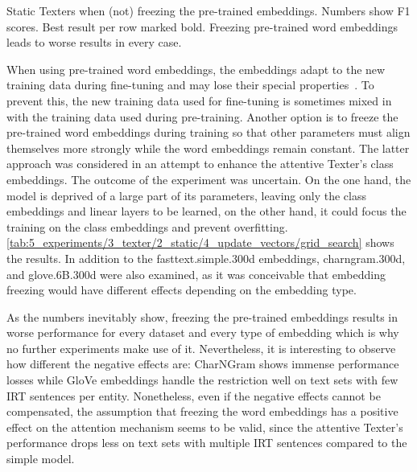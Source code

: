\begin{table}
    \centering
    
    \caption{Static Texters when (not) freezing the pre-trained embeddings. Numbers show F1 scores. Best result per row marked bold. Freezing pre-trained word embeddings leads to worse results in every case.}
    \label{tab:5_experiments/3_texter/2_static/4_update_vectors/grid_search}
\end{table}

When using pre-trained word embeddings, the embeddings adapt to the new training data during fine-tuning and may lose their special properties~\cite{He2019AnalyzingTF}. To prevent this, the new training data used for fine-tuning is sometimes mixed in with the training data used during pre-training. Another option is to freeze the pre-trained word embeddings during training so that other parameters must align themselves more strongly while the word embeddings remain constant. The latter approach was considered in an attempt to enhance the attentive Texter's class embeddings. The outcome of the experiment was uncertain. On the one hand, the model is deprived of a large part of its parameters, leaving only the class embeddings and linear layers to be learned, on the other hand, it could focus the training on the class embeddings and prevent overfitting. \autoref{tab:5_experiments/3_texter/2_static/4_update_vectors/grid_search} shows the results. In addition to the fasttext.simple.300d embeddings, charngram.300d, and glove.6B.300d were also examined, as it was conceivable that embedding freezing would have different effects depending on the embedding type.

As the numbers inevitably show, freezing the pre-trained embeddings results in worse performance for every dataset and every type of embedding which is why no further experiments make use of it. Nevertheless, it is interesting to observe how different the negative effects are: CharNGram shows immense performance losses while GloVe embeddings handle the restriction well on text sets with few IRT sentences per entity. Nonetheless, even if the negative effects cannot be compensated, the assumption that freezing the word embeddings has a positive effect on the attention mechanism seems to be valid, since the attentive Texter's performance drops less on text sets with multiple IRT sentences compared to the simple model.
